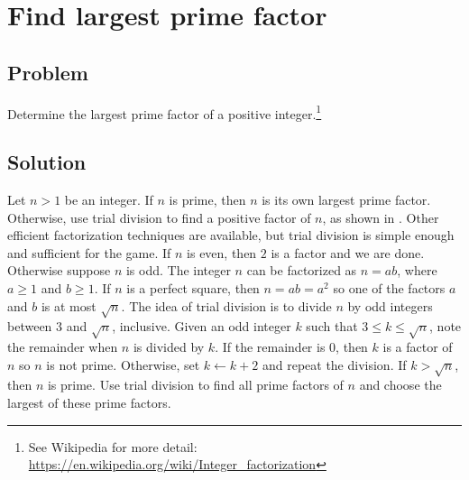 
\section{Find largest prime factor}



\subsection*{Problem}

Determine the largest prime factor of a positive integer.\footnote{
  See Wikipedia for more detail:
  \url{https://en.wikipedia.org/wiki/Integer_factorization}
}



\subsection*{Solution}

Let $n > 1$ be an integer.  If $n$ is prime, then $n$ is its own
largest prime factor.  Otherwise, use trial division to find a
positive factor of $n$, as shown in .
Other efficient factorization techniques are available, but trial
division is simple enough and sufficient for the game.  If $n$ is
even, then $2$ is a factor and we are done. Otherwise suppose $n$ is
odd.  The integer $n$ can be factorized as $n = ab$, where $a \geq 1$
and $b \geq 1$.  If $n$ is a perfect square, then $n = ab = a^2$ so
one of the factors $a$ and $b$ is at most $\sqrt{n}$.  The idea of
trial division is to divide $n$ by odd integers between $3$ and
$\sqrt{n}$, inclusive.  Given an odd integer $k$ such that
$3 \leq k \leq \sqrt{n}$, note the remainder when $n$ is divided by
$k$.  If the remainder is $0$, then $k$ is a factor of $n$ so $n$ is
not prime.  Otherwise, set $k \gets k + 2$ and repeat the division.
If $k > \sqrt{n}$, then $n$ is prime.  Use trial division to find all
prime factors of $n$ and choose the largest of these prime factors.

\begin{algorithm}[!htbp]

\caption{%
  Determine a factor of an integer.
}
\label{alg:prime:factor}
\end{algorithm}
